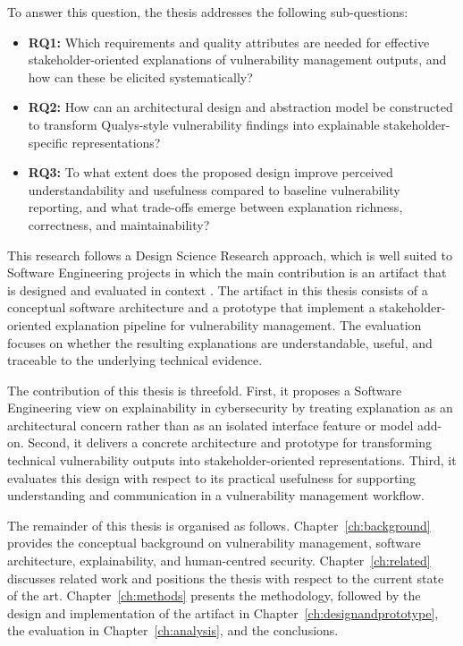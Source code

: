 To answer this question, the thesis addresses the following sub-questions:

\begin{itemize}
    \item \textbf{RQ1:} Which requirements and quality attributes are needed for effective stakeholder-oriented explanations of vulnerability management outputs, and how can these be elicited systematically?
    \item \textbf{RQ2:} How can an architectural design and abstraction model be constructed to transform Qualys-style vulnerability findings into explainable stakeholder-specific representations?
    \item \textbf{RQ3:} To what extent does the proposed design improve perceived understandability and usefulness compared to baseline vulnerability reporting, and what trade-offs emerge between explanation richness, correctness, and maintainability?
\end{itemize}

This research follows a Design Science Research approach, which is well suited to Software Engineering projects in which the main contribution is an artifact that is designed and evaluated in context \cite{hevner2004dsr}. The artifact in this thesis consists of a conceptual software architecture and a prototype that implement a stakeholder-oriented explanation pipeline for vulnerability management. The evaluation focuses on whether the resulting explanations are understandable, useful, and traceable to the underlying technical evidence.

The contribution of this thesis is threefold. First, it proposes a Software Engineering view on explainability in cybersecurity by treating explanation as an architectural concern rather than as an isolated interface feature or model add-on. Second, it delivers a concrete architecture and prototype for transforming technical vulnerability outputs into stakeholder-oriented representations. Third, it evaluates this design with respect to its practical usefulness for supporting understanding and communication in a vulnerability management workflow.

The remainder of this thesis is organised as follows. Chapter~\ref{ch:background} provides the conceptual background on vulnerability management, software architecture, explainability, and human-centred security. Chapter~\ref{ch:related} discusses related work and positions the thesis with respect to the current state of the art. Chapter~\ref{ch:methods} presents the methodology, followed by the design and implementation of the artifact in Chapter~\ref{ch:designandprototype}, the evaluation in Chapter~\ref{ch:analysis}, and the conclusions.